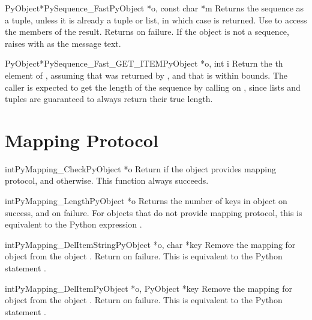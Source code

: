 \documentclass{manual}
\begin{document}
\begin{cfuncdesc}{PyObject*}{PySequence_Fast}{PyObject *o, const char *m}
Returns the sequence  as a tuple, unless it is already a
tuple or list, in which case  is returned.  Use
 to access the members of the
result.  Returns \NULL{} on failure.  If the object is not a sequence,
raises  with  as the message text.
\end{cfuncdesc}

\begin{cfuncdesc}{PyObject*}{PySequence_Fast_GET_ITEM}{PyObject *o, int i}
Return the th element of , assuming that  was
returned by , and that  is within
bounds.  The caller is expected to get the length of the sequence by
calling  on , since lists and tuples
are guaranteed to always return their true length.
\end{cfuncdesc}


\section{Mapping Protocol \label{mapping}}

\begin{cfuncdesc}{int}{PyMapping_Check}{PyObject *o}
Return  if the object provides mapping protocol, and
 otherwise.  This function always succeeds.
\end{cfuncdesc}


\begin{cfuncdesc}{int}{PyMapping_Length}{PyObject *o}
Returns the number of keys in object  on success, and
 on failure.  For objects that do not provide mapping
protocol, this is equivalent to the Python expression
.
\end{cfuncdesc}


\begin{cfuncdesc}{int}{PyMapping_DelItemString}{PyObject *o, char *key}
Remove the mapping for object  from the object .
Return  on failure.  This is equivalent to
the Python statement .
\end{cfuncdesc}


\begin{cfuncdesc}{int}{PyMapping_DelItem}{PyObject *o, PyObject *key}
Remove the mapping for object  from the object .
Return  on failure.  This is equivalent to
the Python statement .
\end{cfuncdesc}
\end{document}
